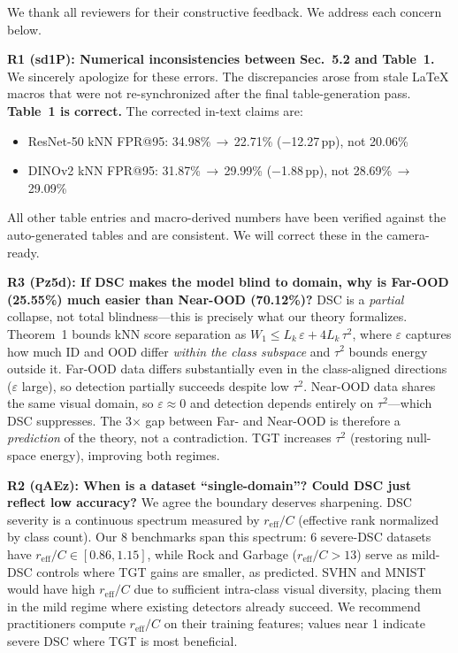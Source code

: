\documentclass[runningheads]{llncs}
\begin{document}
\noindent We thank all reviewers for their constructive feedback. We address each concern below.

\medskip
\noindent\textbf{R1 (sd1P): Numerical inconsistencies between Sec.~5.2 and Table~1.}
We sincerely apologize for these errors. The discrepancies arose from stale LaTeX macros that were not re-synchronized after the final table-generation pass. \textbf{Table~1 is correct.} The corrected in-text claims are:
\begin{itemize}\setlength\itemsep{0pt}
\item ResNet-50 kNN FPR@95: 34.98\%\,$\to$\,22.71\% ($-$12.27\,pp), not 20.06\%
\item DINOv2 kNN FPR@95: 31.87\%\,$\to$\,29.99\% ($-$1.88\,pp), not 28.69\%\,$\to$\,29.09\%
\end{itemize}
All other table entries and macro-derived numbers have been verified against the auto-generated tables and are consistent. We will correct these in the camera-ready.

\medskip
\noindent\textbf{R3 (Pz5d): If DSC makes the model blind to domain, why is Far-OOD (25.55\%) much easier than Near-OOD (70.12\%)?}
DSC is a \emph{partial} collapse, not total blindness---this is precisely what our theory formalizes. Theorem~1 bounds kNN score separation as $W_1 \leq L_k\,\varepsilon + 4L_k\,\tau^2$, where $\varepsilon$ captures how much ID and OOD differ \emph{within the class subspace} and $\tau^2$ bounds energy outside it. Far-OOD data differs substantially even in the class-aligned directions ($\varepsilon$ large), so detection partially succeeds despite low $\tau^2$. Near-OOD data shares the same visual domain, so $\varepsilon \approx 0$ and detection depends entirely on $\tau^2$---which DSC suppresses. The 3$\times$ gap between Far- and Near-OOD is therefore a \emph{prediction} of the theory, not a contradiction. TGT increases $\tau^2$ (restoring null-space energy), improving both regimes.

\medskip
\noindent\textbf{R2 (qAEz): When is a dataset ``single-domain''? Could DSC just reflect low accuracy?}
We agree the boundary deserves sharpening. DSC severity is a continuous spectrum measured by $r_\text{eff}/C$ (effective rank normalized by class count). Our 8 benchmarks span this spectrum: 6 severe-DSC datasets have $r_\text{eff}/C \in [0.86, 1.15]$, while Rock and Garbage ($r_\text{eff}/C > 13$) serve as mild-DSC controls where TGT gains are smaller, as predicted. SVHN and MNIST would have high $r_\text{eff}/C$ due to sufficient intra-class visual diversity, placing them in the mild regime where existing detectors already succeed. We recommend practitioners compute $r_\text{eff}/C$ on their training features; values near 1 indicate severe DSC where TGT is most beneficial.
\end{document}
